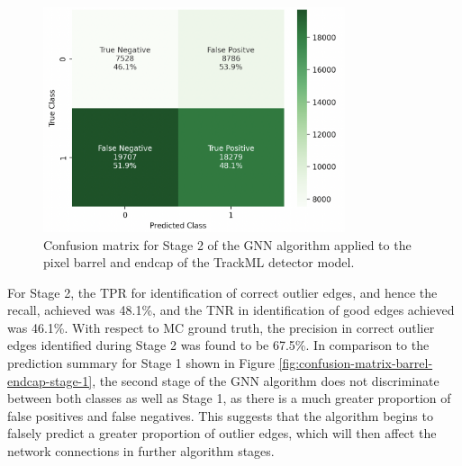 \begin{figure}[htbp]
    \centering
    \includegraphics[width=0.79\textwidth]{images/7-results/confusion_matrix_barrel_stage_2.png}
    \caption{Confusion matrix for Stage 2 of the GNN algorithm applied to the pixel barrel and endcap of the TrackML detector model.}
    \label{fig:confusion-matrix-barrel-endcap-stage-2}%
\end{figure}

For Stage 2, the TPR for identification of correct outlier edges, and hence the recall, achieved was 48.1\%, and the TNR in identification of good edges achieved was 46.1\%. With respect to MC ground truth, the precision in correct outlier edges identified during Stage 2 was found to be 67.5\%. In comparison to the prediction summary for Stage 1 shown in Figure \ref{fig:confusion-matrix-barrel-endcap-stage-1}, the second stage of the GNN algorithm does not discriminate between both classes as well as Stage 1, as there is a much greater proportion of false positives and false negatives. This suggests that the algorithm begins to falsely predict a greater proportion of outlier edges, which will then affect the network connections in further algorithm stages.








